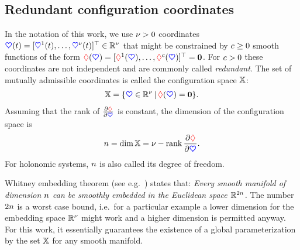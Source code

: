 \subsection{Redundant configuration coordinates}\label{sec:MathConfigCoord}
In the notation of this work, we use $\numCoord > 0$ coordinates $\sysCoord(t) = [\sysCoordCoeff{1}(t),\ldots,\sysCoordCoeff{\numCoord}(t)]^\top \in \RealNum^\numCoord$ that might be constrained by $\numGeoConst \geq 0$ smooth functions of the form $\geoConstraint(\sysCoord) = [\geoConstraintCoeff{1}(\sysCoord), \ldots, \geoConstraintCoeff{\numGeoConst}(\sysCoord)]^\top = \tuple{0}$.
For $\numGeoConst > 0$ these coordinates are not independent and are commonly called \textit{redundant}.
The set of mutually admissible coordinates is called the configuration space $\configSpace$:
\begin{align}
 \configSpace = \{ \sysCoord \in \RealNum^{\numCoord} \, | \, \geoConstraint(\sysCoord) = \tuple{0} \}.
\end{align}
Assuming that the rank of $\pdiff[\geoConstraint]{\sysCoord}$ is constant, the dimension of the configuration space is
\begin{align}
 \dimConfigSpace = \dim \configSpace = \numCoord - \rank \pdiff[\geoConstraint]{\sysCoord}.
\end{align}For holonomic systems, $\dimConfigSpace$ is also called its degree of freedom.

Whitney embedding theorem (see e.g.\ \cite[Theo.\,6.14]{Lee:SmoothManifolds}) states that: \textit{Every smooth manifold of dimension $\dimConfigSpace$ can be smoothly embedded in the Euclidean space $\RealNum^{2\dimConfigSpace}$.}
The number $2\dimConfigSpace$ is a worst case bound, i.e.\ for a particular example a lower dimension for the embedding space $\RealNum^\numCoord$ might work and a higher dimension is permitted anyway.
For this work, it essentially guarantees the existence of a global parameterization by the set $\configSpace$ for any smooth manifold.


